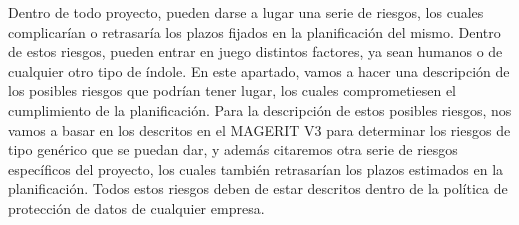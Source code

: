 Dentro de todo proyecto, pueden darse a lugar una serie de riesgos, los cuales
complicarían o retrasaría los plazos fijados en la planificación del mismo.
Dentro de estos riesgos, pueden entrar en juego distintos factores, ya sean
humanos o de cualquier otro tipo de índole. En este apartado, vamos a hacer una
descripción de los posibles riesgos que podrían tener lugar, los cuales
comprometiesen el cumplimiento de la planificación. Para la descripción de estos
posibles riesgos, nos vamos a basar en los descritos en el MAGERIT V3
\cite{mageritv3} para determinar los riesgos de tipo genérico que se puedan dar,
y además citaremos otra serie de riesgos específicos del proyecto, los cuales
también retrasarían los plazos estimados en la planificación. Todos estos
riesgos deben de estar descritos dentro de la política de protección de datos de
cualquier empresa.
